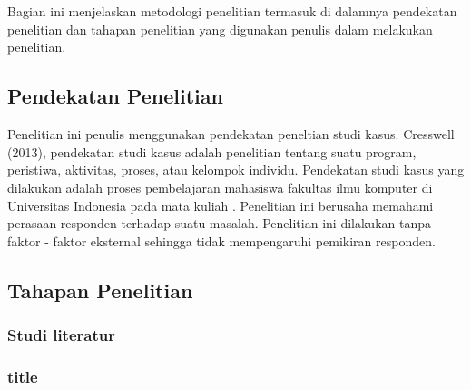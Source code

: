 \chapter{\babTiga}
Bagian ini menjelaskan metodologi penelitian termasuk di dalamnya pendekatan penelitian dan tahapan penelitian yang digunakan penulis dalam melakukan penelitian.
\section{Pendekatan Penelitian}

Penelitian ini penulis menggunakan pendekatan peneltian studi kasus. Cresswell (2013), pendekatan studi kasus adalah penelitian tentang suatu program, peristiwa, aktivitas, proses, atau kelompok individu.
\linebreak\linebreak
Pendekatan studi kasus yang dilakukan adalah proses pembelajaran mahasiswa fakultas ilmu komputer di Universitas Indonesia pada mata kuliah {\ddp}. Penelitian ini berusaha memahami perasaan responden terhadap suatu masalah. Penelitian ini dilakukan tanpa faktor - faktor eksternal sehingga tidak mempengaruhi pemikiran responden.

\section{Tahapan Penelitian}



\subsection{Studi literatur}


\subsection{title}

